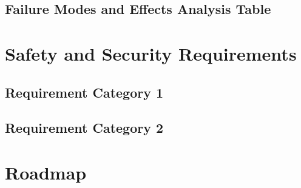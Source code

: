 \documentclass{article}
\begin{document}
\subsection{Failure Modes and Effects Analysis Table}

\section{Safety and Security Requirements}
\subsection{Requirement Category 1}
\subsection{Requirement Category 2}

\section{Roadmap}
\end{document}
